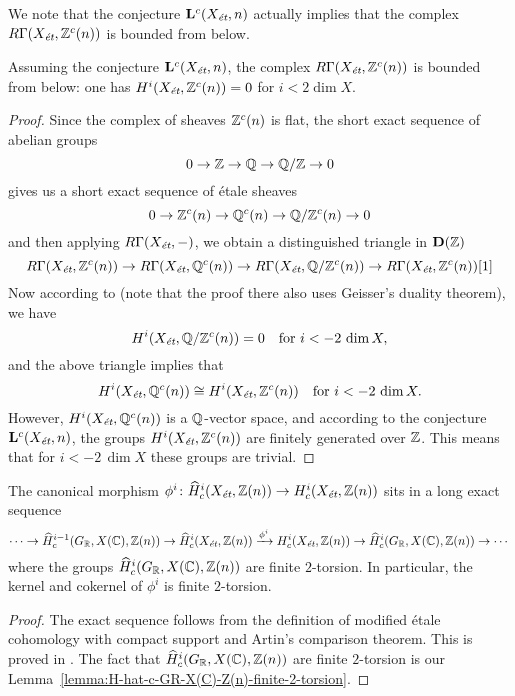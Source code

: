 \documentclass{article}
\numberwithin{equation}{section}
\begin{document}
We note that the conjecture $\mathbf{L}^c (X_\et, n)$ actually implies that the
complex $R\Gamma (X_\et, \ZZ^c (n))$ is bounded from below.

\begin{lemma}
  \label{lemma:RGamma(Xet,Zc(n))-bounded-from-below}
  Assuming the conjecture $\mathbf{L}^c (X_\et, n)$, the complex
  $R\Gamma (X_\et, \ZZ^c (n))$ is bounded from below:
  one has $H^i (X_\et, \ZZ^c (n)) = 0$ for $i < 2\dim X$.

  \begin{proof}
    Since the complex of sheaves $\ZZ^c (n)$ is flat, the short exact sequence of
    abelian groups
    $$0 \to \ZZ \to \QQ \to \QQ/\ZZ \to 0$$
    gives us a short exact sequence of étale sheaves
    $$0 \to \ZZ^c (n) \to \QQ^c (n) \to \QQ/\ZZ^c (n) \to 0$$
    and then applying $R\Gamma (X_\et, -)$, we obtain a distinguished
    triangle in $\mathbf{D} (\ZZ)$
    \[ R\Gamma (X_\et, \ZZ^c (n)) \to
    R\Gamma (X_\et, \QQ^c (n)) \to
    R\Gamma (X_\et, \QQ/\ZZ^c (n)) \to
    R\Gamma (X_\et, \ZZ^c (n)) [1] \]
    Now according to \cite[Lemma~5.12]{Morin-2014} (note that the proof there
    also uses Geisser's duality theorem), we have
    $$H^i (X_\et, \QQ/\ZZ^c (n)) = 0 \quad\text{for }i < -2\,\dim X,$$
    and the above triangle implies that
    \[ H^i (X_\et, \QQ^c (n)) \cong
    H^i (X_\et, \ZZ^c (n)) \quad\text{for }i < -2\,\dim X. \]
    However, $H^i (X_\et, \QQ^c (n))$ is a $\QQ$-vector space, and
    according to the conjecture $\mathbf{L}^c (X_\et, n)$, the groups
    $H^i (X_\et, \ZZ^c (n))$ are finitely generated over $\ZZ$. This
    means that for $i < -2\,\dim X$ these groups are trivial.
  \end{proof}
\end{lemma}

\begin{lemma}
  \label{lemma:morphism-hat-Hc(Xet,Z(n))->Hc(Xet,Z(n))}
  The canonical morphism
  $\phi^i\colon \widehat{H}^i_c (X_\et, \ZZ (n)) \to H^i_c (X_\et, \ZZ (n))$
  sits in a long exact sequence
  \[ \cdots \to \widehat{H}^{i-1}_c (G_\RR, X (\CC), \ZZ (n)) \to
  \widehat{H}_c^i (X_\et, \ZZ(n)) \xrightarrow{\phi^i}
  H_c^i (X_\et, \ZZ(n)) \to
  \widehat{H}^i_c (G_\RR, X (\CC), \ZZ (n)) \to \cdots \]
  where the groups $\widehat{H}^i_c (G_\RR, X (\CC), \ZZ (n))$ are finite
  $2$-torsion.  In particular, the kernel and cokernel of
  $\phi^i$ is finite $2$-torsion.

  \begin{proof}
    The exact sequence follows from the definition of modified étale cohomology
    with compact support and Artin's comparison theorem. This is proved in
    \cite[Lemma~6.14]{Flach-Morin-2018}.
    The fact that $\widehat{H}^i_c (G_\RR, X (\CC), \ZZ (n))$ are finite
    $2$-torsion is our Lemma~\ref{lemma:H-hat-c-GR-X(C)-Z(n)-finite-2-torsion}.
  \end{proof}
\end{lemma}
\end{document}
